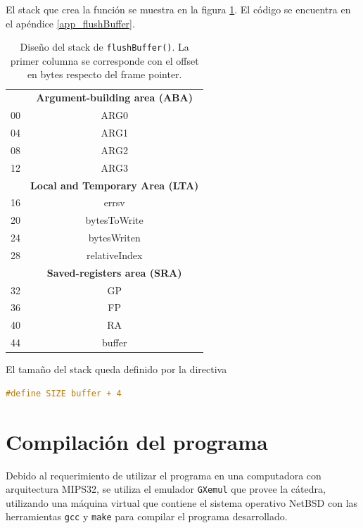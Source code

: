 El stack que crea la función se muestra en la figura \ref{stack_flushBuffer}. El código se encuentra en el apéndice \ref{app_flushBuffer}.

\begin{table}[H]
	\centering
	\begin{tabular}{@{}l|c|@{}}
		\cmidrule(l){2-2} 
		\multicolumn{1}{c|}{\textbf{}} & \textbf{Argument-building area (ABA)} \\ \cmidrule(l){2-2} 
		00 & ARG0 \\ \cmidrule(l){2-2} 
		04 & ARG1 \\ \cmidrule(l){2-2} 
		08 & ARG2 \\ \cmidrule(l){2-2}
		12 & ARG3 \\ \cmidrule(l){2-2} 
		\multicolumn{1}{c|}{\textbf{}} & \textbf{Local and Temporary Area (LTA)} \\ \cmidrule(l){2-2} 
		16 & errsv \\ \cmidrule(l){2-2} 
		20 & bytesToWrite \\ \cmidrule(l){2-2} 
		24 & bytesWriten \\ \cmidrule(l){2-2} 
		28 & relativeIndex \\ \cmidrule(l){2-2} 		
		\multicolumn{1}{c|}{\textbf{}} & \textbf{Saved-registers area (SRA)} \\ \cmidrule(l){2-2} 
		32 & GP \\ \cmidrule(l){2-2} 
		36 & FP \\ \cmidrule(l){2-2} 
		40 & RA \\ \cmidrule(l){2-2} 
		44 & buffer \\ \cmidrule(l){2-2} 
	\end{tabular}
	\caption{Diseño del stack de \texttt{flushBuffer()}. La primer columna se corresponde con el offset en bytes respecto del frame pointer.}
	\label{stack_flushBuffer}
\end{table}

El tamaño del stack queda definido por la directiva
\begin{lstlisting}[language=C, style=StyleC]
#define SIZE buffer + 4
\end{lstlisting}

\section{Compilación del programa}

Debido al requerimiento de utilizar el programa en una computadora con arquitectura MIPS32, se utiliza el emulador \texttt{GXemul} que provee la cátedra, utilizando una máquina virtual que contiene el sistema operativo NetBSD con las herramientas \texttt{gcc} y \texttt{make} para compilar el programa desarrollado.


